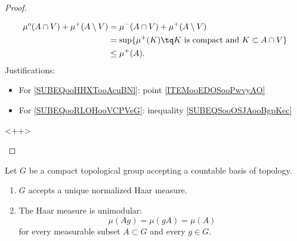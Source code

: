 \begin{proof}
\begin{subproof}
        \begin{subequations}
            \begin{align}
                \mu^o(A\cap V)+\mu^+(A\setminus V)&=\mu^-(A\cap V)+\mu^+(A\setminus V)      \label{SUBEQooHHXTooAcuBNl}\\
                &=\sup\{ \mu^+(K)\tq \text{\( K\) is compact and \( K\subset A\cap V\)} \}\\
                &\leq \mu^+(A).     \label{SUBEQooRLOHooVCPVeG}
            \end{align}
        \end{subequations}
        Justifications:
        \begin{itemize}
            \item For \eqref{SUBEQooHHXTooAcuBNl}: point \ref{ITEMooEDOSooPwvyAO}
            \item For \eqref{SUBEQooRLOHooVCPVeG}: inequality \eqref{SUBEQSooOSJAooBgpKec}
        \end{itemize}
        <++>
        
    \end{subproof}
\end{proof}



\begin{theorem} \label{ThoBZBooOTxqcI}
    Let \( G\) be a compact topological group accepting a countable basis of topology.
    \begin{enumerate}
        \item
            \( G\) accepts a unique normalized Haar measure.
        \item
            The Haar measure is unimodular:
	\begin{equation}
		\mu(Ag)=\mu(gA)=\mu(A)
	\end{equation}
    for every measurable subset \( A\subset G\) and every \( g\in G\).
    \end{enumerate}
\end{theorem}


